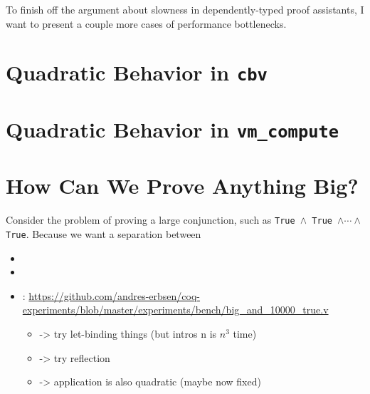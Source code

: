
To finish off the argument about slowness in dependently-typed proof assistants, I want to present a couple more cases of performance bottlenecks.

\section{Quadratic Behavior in \texorpdfstring{\texttt{cbv}}{cbv}}

\section{Quadratic Behavior in \texorpdfstring{\texttt{vm\_compute}}{vm\_compute}}

\section{How Can We Prove Anything Big?}
Consider the problem of proving a large conjunction, such as \texttt{True $\wedge$ True $\wedge \cdots\wedge$ True}.
Because we want a separation between 
\begin{itemize}
  \item {}
  \item {}
  \item {}: \url{https://github.com/andres-erbsen/coq-experiments/blob/master/experiments/bench/big\_and\_10000\_true.v}
  \begin{itemize}
      \item -> try let-binding things (but intros n is $n^3$ time)
      \item -> try reflection
      \item -> application is also quadratic (maybe now fixed)
      \end{itemize}
  
\end{itemize}


